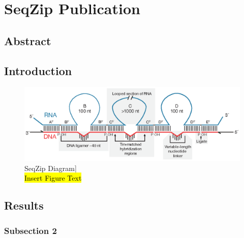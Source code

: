 \chapter{SeqZip Publication} 
\label{Chapter3} 
\section{Abstract}\label{c1sec: Abstract}

\section{Introduction}\label{c3sec: Introduction}

\begin{figure}[htbp]
	\centering 
	\includegraphics{Figures/Chapter3/Roy2014Fig1.eps}
	\caption[SeqZip Diagram]
	{
		SeqZip Diagram]\\
		\hl{Insert Figure Text}
	}
	\label{fig:Roy2014 SeqZip Diagram}
\end{figure}


\section{Results}\label{c3sec: Results}

\subsection{Subsection 2}

